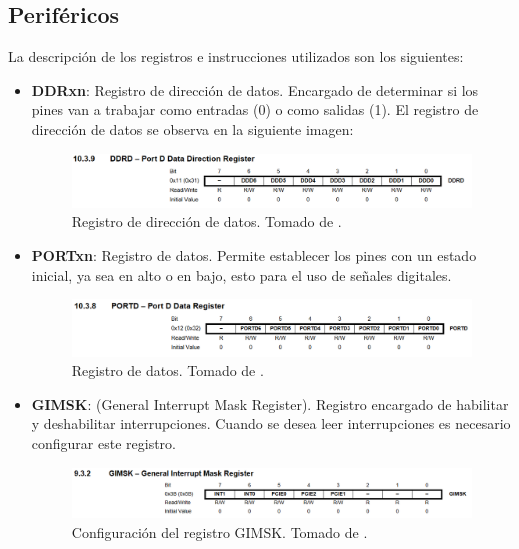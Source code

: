\subsection*{Periféricos}
La descripción de los registros e instrucciones utilizados son los siguientes:
\begin{itemize}
    \item \textbf{DDRxn}: Registro de dirección de datos. Encargado de determinar si los pines van a trabajar como entradas (0) o como salidas (1). El registro de dirección de datos se observa en la siguiente imagen:
    \begin{figure}[H]
        \centering
        \includegraphics[width=.9\linewidth]{Imagenes/DirectionD.png}
        \caption{Registro de dirección de datos. Tomado de \cite{web}.}
        \label{fig4}
    \end{figure}
    
	\item \textbf{PORTxn}: Registro de datos. Permite establecer los pines con un estado inicial, ya sea en alto o en bajo, esto para el uso de señales digitales.
    \begin{figure}[H]
        \centering
        \includegraphics[width=.9\linewidth]{Imagenes/DataD.png}
        \caption{Registro de datos. Tomado de \cite{web}.}
        \label{fig5}
    \end{figure}

    \item \textbf{GIMSK}: (General Interrupt Mask Register). Registro encargado de habilitar y deshabilitar interrupciones. Cuando se desea leer interrupciones es necesario configurar este registro.
    \begin{figure}[H]
        \centering
        \includegraphics[width=.9\linewidth]{Imagenes/GIMSK.png}
        \caption{Configuración del registro GIMSK. Tomado de \cite{web}.}
        \label{fig6}
    \end{figure}


\end{itemize}

